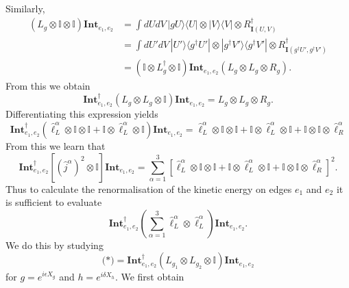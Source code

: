 \documentclass[12pt]{amsart}
\def\CAv{\mathbf{Int}}
\theoremstyle{definition}
\theoremstyle{remark}
\numberwithin{equation}{section}
\begin{document}
Similarly,
\begin{equation}
	\begin{split}
	 (L_g\otimes \mathbb{I} \otimes \mathbb{I}) \CAv_{e_1,e_2} &= \int dUdV \, |gU\rangle\langle U| \otimes  |V\rangle\langle V| \otimes R_{\mathbf{I}(U,V)}^\dag \\
	&= \int dU'dV \, |U'\rangle\langle g^\dag U'| \otimes  |g^\dag V'\rangle\langle g^\dag V'| \otimes R_{\mathbf{I}(g^\dag U',g^\dag V')}^\dag \\
	&= (\mathbb{I} \otimes L_g^\dag   \otimes \mathbb{I}) \CAv_{e_1,e_2} (L_g \otimes L_g\otimes R_g ).
	\end{split}
\end{equation}
From this we obtain
\begin{equation}
	\CAv_{e_1,e_2}^\dag (L_g\otimes L_g \otimes \mathbb{I}) \CAv_{e_1,e_2} = L_g\otimes L_g  \otimes R_g.
\end{equation}
Differentiating this expression yields
\begin{equation}
	\CAv_{e_1,e_2}^\dag (\widehat{\ell}^\alpha_L \otimes \mathbb{I} \otimes \mathbb{I} +  \mathbb{I}  \otimes \widehat{\ell}^\alpha_L \otimes \mathbb{I}) \CAv_{e_1,e_2} = \widehat{\ell}^{\alpha}_L\otimes \mathbb{I}\otimes \mathbb{I} + \mathbb{I}\otimes\widehat{\ell}^{\alpha}_L\otimes  \mathbb{I} +   \mathbb{I}\otimes \mathbb{I}\otimes\widehat{\ell}^{\alpha}_R
\end{equation}
From this we learn that
\begin{equation}
	\CAv_{e_1,e_2}^\dag \left[\left(\widehat{j}^\alpha\right)^2 \otimes \mathbb{I} \right] \CAv_{e_1,e_2} = \sum_{\alpha=1}^3 \left[\widehat{\ell}^{\alpha}_L\otimes \mathbb{I}\otimes \mathbb{I} + \mathbb{I}\otimes\widehat{\ell}^{\alpha}_L\otimes  \mathbb{I} +   \mathbb{I}\otimes \mathbb{I}\otimes\widehat{\ell}^{\alpha}_R \right]^2.
\end{equation}
Thus to calculate the renormalisation of the kinetic energy on edges $e_1$ and $e_2$ it is sufficient to evaluate
\begin{equation}
	\CAv_{e_1,e_2}^\dag \left(\sum_{\alpha=1}^3\widehat{\ell}^\alpha_L\otimes \widehat{\ell}^\alpha_L\right)\CAv_{e_1,e_2}.
\end{equation}
We do this by studying 
\begin{equation}
	\text{(*)} = \CAv_{e_1,e_2}^\dag \left(L_{g_1}\otimes L_{g_2}\otimes \mathbb{I}\right)\CAv_{e_1,e_2}
\end{equation}
for $g = e^{i\epsilon X_g}$ and $h = e^{i\delta X_h}$. We first obtain
\end{document}
